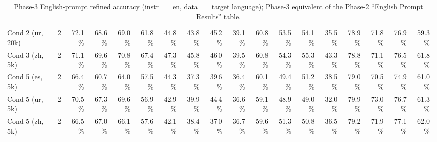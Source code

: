 \begin{table}[t]
\begin{tabular}{lrrrrrrrrrrrrrrrrr}
    Cond 2 (ur, 20k) & 2 & 72.1\% & 68.6\% & 69.0\% & 61.8\% & 44.8\% & 43.8\% & 45.2\% & 39.1\% & 60.8\% & 53.5\% & 54.1\% & 35.5\% & 78.9\% & 71.8\% & 76.9\% & 59.3\% \\
    Cond 3 (zh, 5k) & 2 & 71.1\% & 69.6\% & 70.8\% & 67.4\% & 47.3\% & 45.8\% & 46.0\% & 39.5\% & 60.8\% & 54.3\% & 55.3\% & 43.3\% & 78.8\% & 71.1\% & 76.5\% & 61.8\% \\
    Cond 5 (es, 5k) & 2 & 66.4\% & 60.7\% & 64.0\% & 57.5\% & 44.3\% & 37.3\% & 39.6\% & 36.4\% & 60.1\% & 49.4\% & 51.2\% & 38.5\% & 79.0\% & 70.5\% & 74.9\% & 61.0\% \\
    Cond 5 (ur, 5k) & 2 & 70.5\% & 67.3\% & 69.6\% & 56.9\% & 42.9\% & 39.9\% & 44.4\% & 36.6\% & 59.1\% & 48.9\% & 49.0\% & 32.0\% & 79.9\% & 73.0\% & 76.7\% & 61.3\% \\
    Cond 5 (zh, 5k) & 2 & 66.5\% & 67.0\% & 66.1\% & 57.6\% & 42.1\% & 38.4\% & 37.0\% & 36.7\% & 59.6\% & 51.3\% & 50.8\% & 36.5\% & 79.2\% & 71.9\% & 77.1\% & 62.0\% \\
    \bottomrule
  \end{tabular}
  \caption{Phase-3 English-prompt refined accuracy (instr $=$ en, data $=$ target language); Phase-3 equivalent of the Phase-2 ``English Prompt Results'' table.}
  \label{tab:t2-english}
\end{table}

